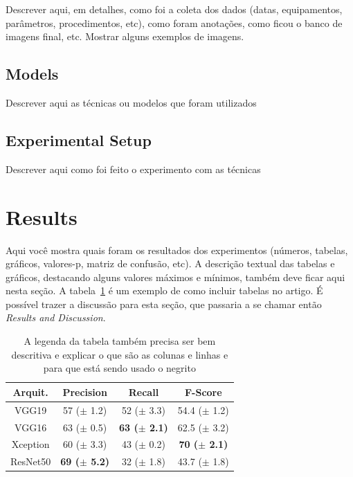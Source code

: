 \documentclass[preprint,10pt,5p]{elsarticle}
\begin{document}
Descrever aqui, em detalhes, como foi a coleta dos dados (datas, equipamentos, parâmetros, procedimentos, etc), como foram anotações, como ficou o banco de imagens final, etc. Mostrar alguns exemplos de imagens.

\subsection{Models}

Descrever aqui as técnicas ou modelos que foram utilizados

\subsection{Experimental Setup}

Descrever aqui como foi feito o experimento com as técnicas




\section{Results}

Aqui você mostra quais foram os resultados dos experimentos (números, tabelas, gráficos, valores-p, matriz de confusão, etc). A descrição textual das tabelas e gráficos, destacando alguns valores máximos e mínimos, também deve ficar aqui nesta seção. A tabela~\ref{table:expDeepLearning} é um exemplo de como incluir tabelas no artigo. É possível trazer a discussão para esta seção, que passaria a se chamar então \textit{Results and Discussion}.


\begin{table}[h!]
\centering
\caption{A legenda da tabela também precisa ser bem descritiva e explicar o que são as colunas e linhas e para que está sendo usado o negrito}
\label{table:expDeepLearning}
\begin{tabular}{|c|c|c|c|} 
   \hline
   Arquit.    & Precision               & Recall                  & F-Score \\ 
   \hline\hline
   VGG19      & 57 ($\pm$ 1.2)          & 52 ($\pm$ 3.3)          & 54.4 ($\pm$ 1.2)\\
   \hline
   VGG16      & 63 ($\pm$ 0.5)          & \textbf{63 ($\pm$ 2.1)} & 62.5 ($\pm$ 3.2)\\
   \hline
   Xception   & 60 ($\pm$ 3.3)          & 43 ($\pm$ 0.2)          & \textbf{70 ($\pm$ 2.1)} \\
   \hline
   ResNet50   & \textbf{69 ($\pm$ 5.2)} & 32 ($\pm$ 1.8)          & 43.7 ($\pm$ 1.8) \\
   \hline
\end{tabular}
\end{table}
\end{document}
